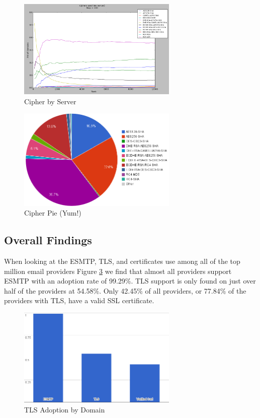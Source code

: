 \begin{figure}
    \includegraphics[width=3.0in]{images/server_ciphers.png}
    \caption{Cipher by Server}
    \label{server_ciphers}
\end{figure}

\begin{figure}
    \includegraphics[width=3.0in]{images/pie_ciphers.png}
    \caption{Cipher Pie (Yum!)}
    \label{cipher_pie}
\end{figure}

\subsection{Overall Findings}
When looking at the ESMTP, TLS, and certificates use among all of the top 
million email providers Figure \ref{overall} we find that almost all 
providers support ESMTP with an adoption rate of 99.29\%. TLS support is only 
found on just over half of the providers at 54.58\%. Only 42.45\% of all 
providers, or 77.84\% of the providers with TLS, have a valid SSL 
certificate.

\begin{figure}
    \includegraphics[width=3.0in]{images/bar_overall.png}
    \caption{TLS Adoption by Domain}
    \label{overall}
\end{figure}


